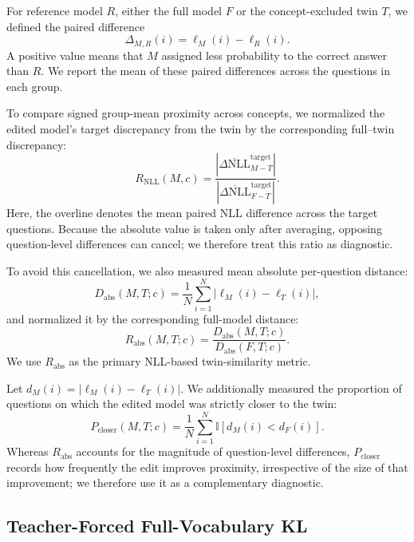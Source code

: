 For reference model $R$, either the full model $F$ or the concept-excluded twin
$T$, we defined the paired difference
\begin{equation}
\Delta_{M,R}(i)=\ell_M(i)-\ell_R(i).
\end{equation}
A positive value means that $M$ assigned less probability to the correct
answer than $R$. We report the mean of these paired differences across the
questions in each group.

To compare signed group-mean proximity across concepts, we normalized the
edited model's target discrepancy from the twin by the corresponding
full--twin discrepancy:
\begin{equation}
R_{\mathrm{NLL}}(M,c)
=
\frac{
\left|
\overline{\Delta\mathrm{NLL}}^{\mathrm{target}}_{M-T}
\right|
}{
\left|
\overline{\Delta\mathrm{NLL}}^{\mathrm{target}}_{F-T}
\right|
}.
\end{equation}
Here, the overline denotes the mean paired NLL difference across the target
questions.
Because the absolute value is
taken only after averaging, opposing question-level differences can cancel;
we therefore treat this ratio as diagnostic.

To avoid this cancellation, we also measured mean absolute per-question
distance:
\begin{equation}
D_{\mathrm{abs}}(M,T;c)
=
\frac{1}{N}
\sum_{i=1}^{N}
\left|\ell_M(i)-\ell_T(i)\right|,
\end{equation}
and normalized it by the corresponding full-model distance:
\begin{equation}
R_{\mathrm{abs}}(M,T;c)
=
\frac{D_{\mathrm{abs}}(M,T;c)}
{D_{\mathrm{abs}}(F,T;c)}.
\end{equation}
We use $R_{\mathrm{abs}}$ as the primary NLL-based twin-similarity metric.

Let $d_M(i)=|\ell_M(i)-\ell_T(i)|$. We additionally measured the proportion
of questions on which the edited model was strictly closer to the twin:
\begin{equation}
P_{\mathrm{closer}}(M,T;c)
=
\frac{1}{N}
\sum_{i=1}^{N}
\mathbb{I}\!\left[d_M(i)<d_F(i)\right].
\end{equation}
Whereas $R_{\mathrm{abs}}$ accounts for the magnitude of question-level
differences, $P_{\mathrm{closer}}$ records how frequently the edit improves
proximity, irrespective of the size of that improvement; we therefore use it
as a complementary diagnostic.

\subsection{Teacher-Forced Full-Vocabulary KL}

